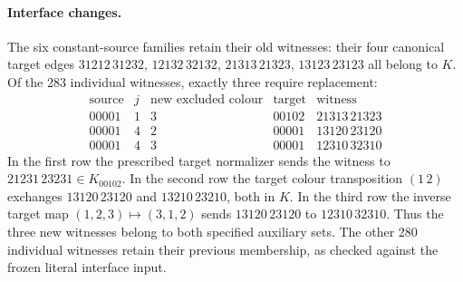 \paragraph{Interface changes.}
The six constant-source families retain their old witnesses:
their four canonical target edges
$31212\,31232$, $12132\,32132$, $21313\,21323$,
$13123\,23123$ all belong to $K$.
Of the 283 individual witnesses, exactly three require replacement:
\[
\begin{array}{c|c|c|c|c}
\text{source}&j&\text{new excluded colour}&\text{target}&\text{witness}\\
\hline
00001&1&3&00102&21313\,21323\\
00001&4&2&00001&13120\,23120\\
00001&4&3&00001&12310\,32310
\end{array}
\]
In the first row the prescribed target normalizer sends the witness
to $21231\,23231\in K_{00102}$. In the second row the target
colour transposition $(1\,2)$ exchanges $13120\,23120$ and
$13210\,23210$, both in $K$. In the third row the inverse target
map $(1,2,3)\mapsto(3,1,2)$ sends $13120\,23120$ to
$12310\,32310$. Thus the three new witnesses belong to both
specified auxiliary sets. The other 280 individual witnesses
retain their previous membership, as checked against the frozen
literal interface input.

